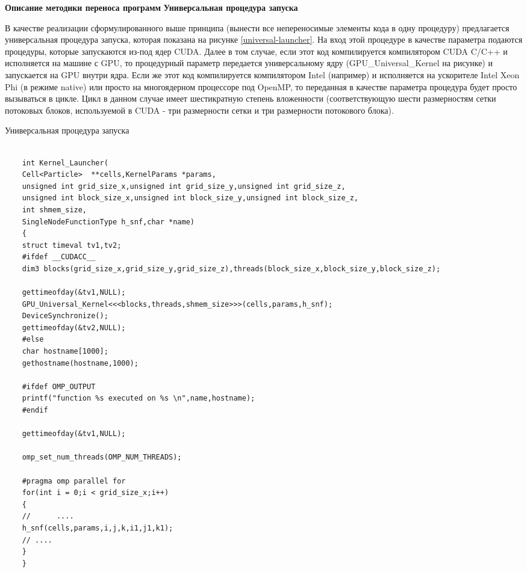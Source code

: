 \textbf{Описание методики переноса программ}
\textbf{Универсальная процедура запуска}

В качестве реализации сформулированного выше принципа (вынести все непереносимые элементы кода в одну процедуру) предлагается универсальная процедура запуска, которая показана на рисунке \ref{universal-launcher}. На вход этой процедуре в качестве параметра подаются процедуры, которые запускаются из-под ядер CUDA. Далее в том случае, если этот код компилируется компилятором CUDA C/C++ и исполняется на машине с GPU, то процедурный параметр передается универсальному ядру (GPU\_Universal\_Kernel на рисунке) и запускается на GPU внутри ядра. Если же этот код компилируется компилятором Intel (например) и исполняется
на ускорителе Intel Xeon Phi (в режиме native) или просто на многоядерном процессоре под OpenMP, то переданная в качестве параметра процедура будет просто вызываться в цикле. Цикл в данном случае имеет шестикратную степень вложенности (соответствующую шести размерностям сетки потоковых блоков, используемой в CUDA - три размерности сетки и три размерности потокового блока).
\begin{ListingEnv}[!h]
	\captiondelim{ } %
	\caption{Универсальная процедура запуска}
	\label{universal-launcher}	
	\begin{lstlisting}[language={[ISO]C++}]
	
	int Kernel_Launcher(
	Cell<Particle>  **cells,KernelParams *params,
	unsigned int grid_size_x,unsigned int grid_size_y,unsigned int grid_size_z,
	unsigned int block_size_x,unsigned int block_size_y,unsigned int block_size_z,
	int shmem_size,
	SingleNodeFunctionType h_snf,char *name)
	{
	struct timeval tv1,tv2;
	#ifdef __CUDACC__
	dim3 blocks(grid_size_x,grid_size_y,grid_size_z),threads(block_size_x,block_size_y,block_size_z);
	
	gettimeofday(&tv1,NULL);
	GPU_Universal_Kernel<<<blocks,threads,shmem_size>>>(cells,params,h_snf);
	DeviceSynchronize();
	gettimeofday(&tv2,NULL);
	#else
	char hostname[1000];
	gethostname(hostname,1000);
	
	#ifdef OMP_OUTPUT
	printf("function %s executed on %s \n",name,hostname);
	#endif
	
	gettimeofday(&tv1,NULL);
	
	omp_set_num_threads(OMP_NUM_THREADS);
	
	#pragma omp parallel for
	for(int i = 0;i < grid_size_x;i++)
	{
	//      ....              
	h_snf(cells,params,i,j,k,i1,j1,k1);
	// ....
	}
	}
	\end{lstlisting}
\end{ListingEnv}

